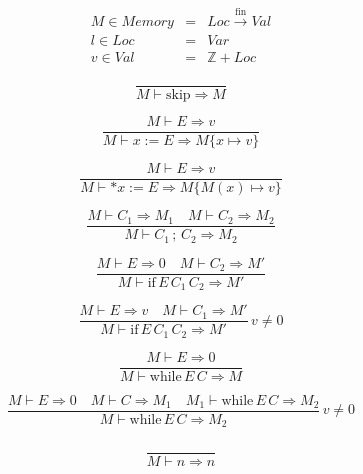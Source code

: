 \documentclass{article}
\begin{document}
\begin{eqnarray*}
  M \in Memory & = & Loc \stackrel{\textrm{fin}}{\to} Val \\
  l \in Loc & = & Var \\
  v \in Val & = & \mathbb{Z} + Loc
\end{eqnarray*}

\begin{displaymath}
  \frac{ }{M \vdash \textrm{skip} \Rightarrow M}
\end{displaymath}

\begin{displaymath}
  \frac{M \vdash E \Rightarrow v}{M \vdash x := E \Rightarrow M\{x \mapsto v\}}
\end{displaymath}

\begin{displaymath}
  \frac{M \vdash E \Rightarrow v}{M \vdash *x := E \Rightarrow M\{M(x) \mapsto v\}}
\end{displaymath}

\begin{displaymath}
  \frac{M \vdash {C}_{1} \Rightarrow {M}_{1} \quad M \vdash {C}_{2} \Rightarrow {M}_{2}}{M \vdash {C}_{1} \, ; \, {C}_{2} \Rightarrow {M}_{2}}
\end{displaymath}

\begin{displaymath}
  \frac{M \vdash E \Rightarrow 0 \quad M \vdash {C}_{2} \Rightarrow M'}{M \vdash \textrm{if} \, E \, {C}_{1} \, {C}_{2} \Rightarrow M'}
\end{displaymath}

\begin{displaymath}
  \frac{M \vdash E \Rightarrow v \quad M \vdash {C}_{1} \Rightarrow M'}{M \vdash \textrm{if} \, E \, {C}_{1} \, {C}_{2} \Rightarrow M'} \, v \neq 0
\end{displaymath}

\begin{displaymath}
  \frac{M \vdash E \Rightarrow 0}{M \vdash \textrm{while} \, E \, C \Rightarrow M}
\end{displaymath}

\begin{displaymath}
  \frac{M \vdash E \Rightarrow 0 \quad M \vdash C \Rightarrow {M}_{1} \quad {M}_{1} \vdash \textrm{while} \, E \, C \Rightarrow {M}_{2}}{M \vdash \textrm{while} \, E \, C \Rightarrow {M}_{2}} \, v \neq 0
\end{displaymath}
\\
\begin{displaymath}
  \frac{ }{M \vdash n \Rightarrow n}
\end{displaymath}
\end{document}
